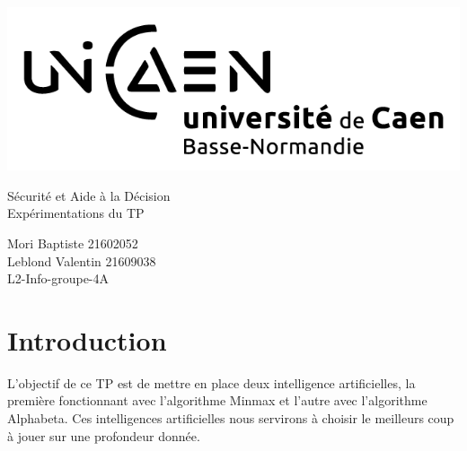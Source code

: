 \documentclass[a4paper,12pt]{article} %
\begin{document}




\begin{titlepage}

\includegraphics[scale=0.3]{images/unicaen.png}

\vspace{7cm}

\begin{center}

\begin{Huge}
Sécurité et Aide à la Décision\\
Expérimentations du TP\\
\end{Huge}
\vspace{2cm}
\begin{large}
Mori Baptiste 21602052\\
Leblond Valentin 21609038\\
\vspace{1cm}
L2-Info-groupe-4A
\end{large}

\end{center}
\end{titlepage}



\newpage

\tableofcontents{}

\newpage



\section*{Introduction}

L'objectif de ce TP est de mettre en place deux intelligence artificielles, la première fonctionnant avec l'algorithme Minmax et l'autre avec l'algorithme Alphabeta. Ces intelligences artificielles nous servirons à choisir le meilleurs coup à jouer sur une profondeur donnée.
\end{document}
